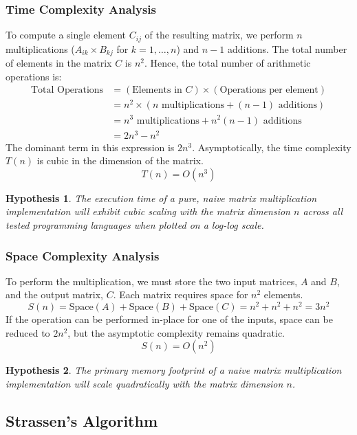 \documentclass[11pt, a4paper, titlepage]{scrartcl}
\newtheorem{hypothesis}{Hypothesis}
\begin{document}
\subsubsection{Time Complexity Analysis}
To compute a single element \(C_{ij}\) of the resulting matrix, we perform \(n\) multiplications (\(A_{ik} \times B_{kj}\) for \(k=1, \dots, n\)) and \(n-1\) additions.
The total number of elements in the matrix \(C\) is \(n^2\). Hence, the total number of arithmetic operations is:
\begin{align*}
    \text{Total Operations} &= (\text{Elements in } C) \times (\text{Operations per element}) \\
    &= n^2 \times (n \text{ multiplications} + (n-1) \text{ additions}) \\
    &= n^3 \text{ multiplications} + n^2(n-1) \text{ additions} \\
    &= 2n^3 - n^2
\end{align*}
The dominant term in this expression is \(2n^3\). Asymptotically, the time complexity \(T(n)\) is cubic in the dimension of the matrix.
\[ T(n) = O(n^3) \]

\begin{hypothesis}
The execution time of a pure, naive matrix multiplication implementation will exhibit cubic scaling with the matrix dimension \(n\) across all tested programming languages when plotted on a log-log scale.
\end{hypothesis}

\subsubsection{Space Complexity Analysis}
To perform the multiplication, we must store the two input matrices, \(A\) and \(B\), and the output matrix, \(C\). Each matrix requires space for \(n^2\) elements.
\[ S(n) = \text{Space}(A) + \text{Space}(B) + \text{Space}(C) = n^2 + n^2 + n^2 = 3n^2 \]
If the operation can be performed in-place for one of the inputs, space can be reduced to \(2n^2\), but the asymptotic complexity remains quadratic.
\[ S(n) = O(n^2) \]

\begin{hypothesis}
The primary memory footprint of a naive matrix multiplication implementation will scale quadratically with the matrix dimension \(n\).
\end{hypothesis}

\subsection{Strassen's Algorithm}
\end{document}
